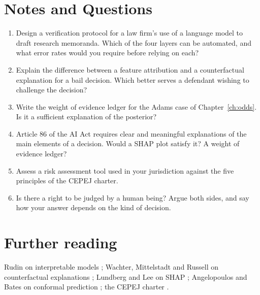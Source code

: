 \section*{Notes and Questions}
\begin{enumerate}[label=\arabic*.]
\item Design a verification protocol for a law firm's use of a language model to draft research memoranda. Which of the four layers can be automated, and what error rates would you require before relying on each?
\item Explain the difference between a feature attribution and a counterfactual explanation for a bail decision. Which better serves a defendant wishing to challenge the decision?
\item Write the weight of evidence ledger for the Adams case of Chapter~\ref{ch:odds}. Is it a sufficient explanation of the posterior?
\item Article 86 of the AI Act requires clear and meaningful explanations of the main elements of a decision. Would a SHAP plot satisfy it? A weight of evidence ledger?
\item Assess a risk assessment tool used in your jurisdiction against the five principles of the CEPEJ charter.
\item Is there a right to be judged by a human being? Argue both sides, and say how your answer depends on the kind of decision.
\end{enumerate}

\section*{Further reading}
Rudin on interpretable models \citep{rudin2019}; Wachter, Mittelstadt and Russell on counterfactual explanations \citep{wachter2018}; Lundberg and Lee on SHAP \citep{lundberg2017}; Angelopoulos and Bates on conformal prediction \citep{angelopoulos2023}; the CEPEJ charter \citep{cepej2018}.
